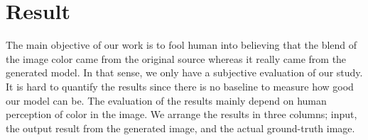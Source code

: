 \documentclass[10pt,twocolumn,letterpaper]{article}
\begin{document}

\section{Result}
The main objective of our work is to fool human into believing that the blend of the image color came from the original source whereas it really came from the generated model. In that sense, we only have a subjective evaluation of our study. It is hard to quantify the results since there is no baseline to measure how good our model can be. The evaluation of the results mainly depend on human perception of color in the image. We arrange the results in three columns; input, the output result from the generated image, and the actual ground-truth image. 
\end{document}
